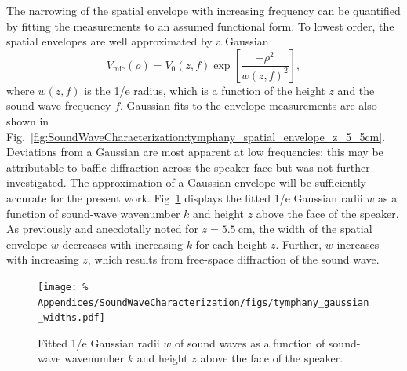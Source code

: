 The narrowing of the spatial envelope with increasing frequency
can be quantified by fitting the measurements
to an assumed functional form.
To lowest order, the spatial envelopes are well approximated by a Gaussian
\begin{equation}
  V_{\text{mic}}(\rho)
  =
  V_0(z, f)
  \exp\left[
    \frac{-\rho^2}{w(z, f)^2}
  \right],
  \label{eq:SoundWaveCharacterization:Gaussian}
\end{equation}
where $w(z, f)$ is the 1/e radius, which
is a function of the height $z$ and the sound-wave frequency $f$.
Gaussian fits to the envelope measurements are also shown in
Fig.~\ref{fig:SoundWaveCharacterization:tymphany_spatial_envelope_z_5_5cm}.
Deviations from a Gaussian are most apparent at low frequencies;
this may be attributable to baffle diffraction across the speaker face but
was not further investigated.
The approximation of a Gaussian envelope
will be sufficiently accurate for the present work.
Fig~\ref{fig:SoundWaveCharacterization:tymphany_gaussian_widths}
displays the fitted 1/e Gaussian radii $w$ as a function of
sound-wave wavenumber $k$ and
height $z$ above the face of the speaker.
As previously and anecdotally noted for $z = \SI{5.5}{\centi\meter}$,
the width of the spatial envelope $w$
decreases with increasing $k$ for each height $z$.
Further, $w$ increases with increasing $z$, which
results from free-space diffraction of the sound wave.

\begin{figure}
  \centering
  \texttt{[image: \%
    Appendices/SoundWaveCharacterization/figs/tymphany\_gaussian\_widths.pdf]}
  \caption[Gaussian widths of sound waves]{%
    Fitted 1/e Gaussian radii $w$ of sound waves
    as a function of sound-wave wavenumber $k$ and
    height $z$ above the face of the speaker.
  }
\label{fig:SoundWaveCharacterization:tymphany_gaussian_widths}
\end{figure}


